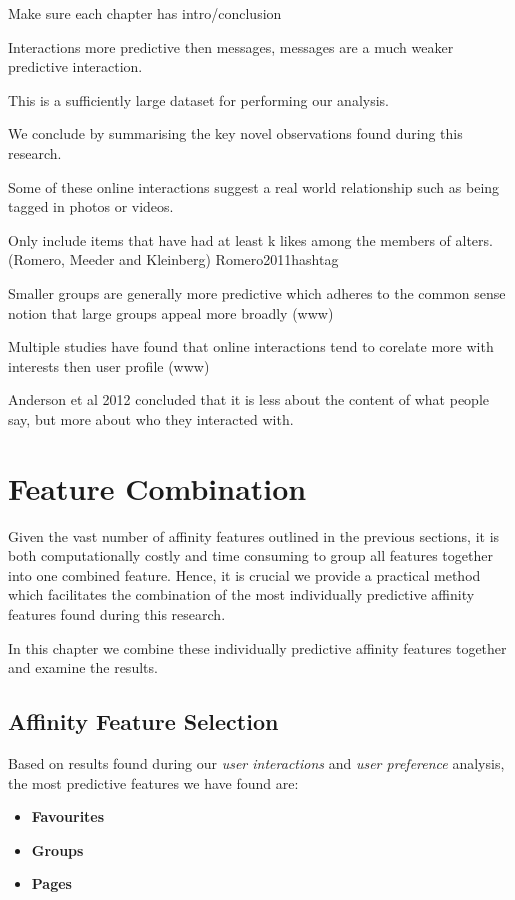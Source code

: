 Make sure each chapter has intro/conclusion


Interactions more predictive then messages, messages are a much weaker predictive interaction.

This is a sufficiently large dataset for performing our analysis.

We conclude by summarising the key novel observations found during this research.

Some of these online interactions suggest a real world relationship such as being tagged in photos or videos.

Only include items that have had at least k likes among the members of alters. (Romero, Meeder and Kleinberg)
Romero2011hashtag

Smaller groups are generally more predictive which adheres to the common sense notion that large groups appeal more 
broadly (www)

Multiple studies have found that online interactions tend to corelate more with interests then user profile (www)

Anderson et al 2012 concluded that it is less about the content of what people say, but more about who they interacted with.


\chapter{Feature Combination}
\label{cha:bma}

Given the vast number of affinity features outlined in the previous sections, it is both computationally costly and time 
consuming to group all features together into one combined feature. Hence, it is crucial we provide a practical method which 
facilitates the combination of the most individually predictive affinity features found during this research.

In this chapter we combine these individually predictive affinity features together and examine the results.

\section{Affinity Feature Selection}
\label{sec:notation}

Based on results found during our \emph{user interactions} and \emph{user preference} analysis, the most predictive features we have found are:
\begin{itemize}
\item \textbf{Favourites}
\item \textbf{Groups}
\item \textbf{Pages}
\end{itemize}

